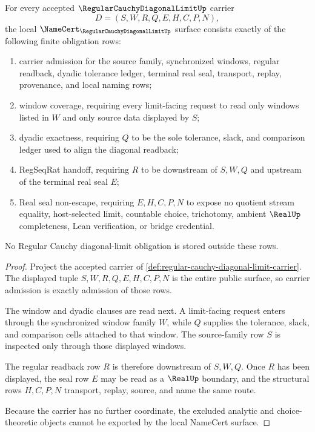 \begin{theorem}
\label{thm:regular-cauchy-diagonal-limit-namecert-obligations}
For every accepted $\RegularCauchyDiagonalLimitUp$ carrier
$$
D=(S,W,R,Q,E,H,C,P,N),
$$
the local $\NameCert_{\RegularCauchyDiagonalLimitUp}$ surface consists exactly of the following finite obligation rows:
\begin{enumerate}
\item carrier admission for the source family, synchronized windows, regular readback, dyadic tolerance ledger, terminal real seal, transport, replay, provenance, and local naming rows;
\item window coverage, requiring every limit-facing request to read only windows listed in $W$ and only source data displayed by $S$;
\item dyadic exactness, requiring $Q$ to be the sole tolerance, slack, and comparison ledger used to align the diagonal readback;
\item RegSeqRat handoff, requiring $R$ to be downstream of $S,W,Q$ and upstream of the terminal real seal $E$;
\item Real seal non-escape, requiring $E,H,C,P,N$ to expose no quotient stream equality, host-selected limit, countable choice, trichotomy, ambient $\RealUp$ completeness, Lean verification, or bridge credential.
\end{enumerate}
No Regular Cauchy diagonal-limit obligation is stored outside these rows.
\end{theorem}
\begin{proof}
Project the accepted carrier of \autoref{def:regular-cauchy-diagonal-limit-carrier}. The displayed tuple $S,W,R,Q,E,H,C,P,N$ is the entire public surface, so carrier admission is exactly admission of those rows.

The window and dyadic clauses are read next. A limit-facing request enters through the synchronized window family $W$, while $Q$ supplies the tolerance, slack, and comparison cells attached to that window. The source-family row $S$ is inspected only through those displayed windows.

The regular readback row $R$ is therefore downstream of $S,W,Q$. Once $R$ has been displayed, the seal row $E$ may be read as a $\RealUp$ boundary, and the structural rows $H,C,P,N$ transport, replay, source, and name the same route.

Because the carrier has no further coordinate, the excluded analytic and choice-theoretic objects cannot be exported by the local NameCert surface.
\end{proof}


